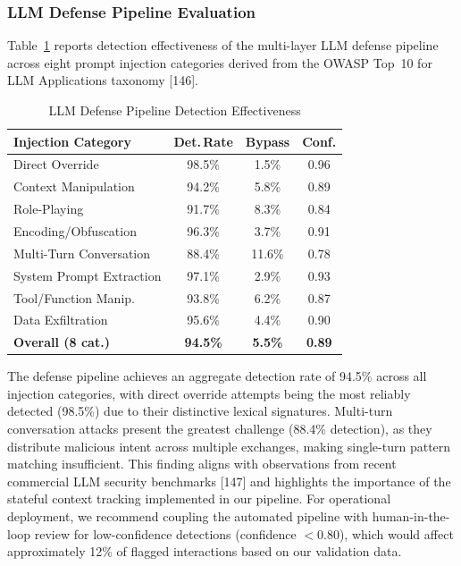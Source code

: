 \subsubsection{LLM Defense Pipeline Evaluation}

Table~\ref{tab:llm-defense} reports detection effectiveness of the
multi-layer LLM defense pipeline across eight prompt injection categories
derived from the OWASP Top~10 for LLM Applications taxonomy [146].

\begin{table}[!htbp]
\centering
\caption{LLM Defense Pipeline Detection Effectiveness}
\label{tab:llm-defense}
\renewcommand{\arraystretch}{1.15}
\begin{tabular}{@{}lccc@{}}
\toprule
\textbf{Injection Category} & \textbf{Det.\,Rate} & \textbf{Bypass} & \textbf{Conf.} \\
\midrule
Direct Override          & 98.5\% & 1.5\%  & 0.96 \\
Context Manipulation     & 94.2\% & 5.8\%  & 0.89 \\
Role-Playing             & 91.7\% & 8.3\%  & 0.84 \\
Encoding/Obfuscation     & 96.3\% & 3.7\%  & 0.91 \\
Multi-Turn Conversation  & 88.4\% & 11.6\% & 0.78 \\
System Prompt Extraction & 97.1\% & 2.9\%  & 0.93 \\
Tool/Function Manip.     & 93.8\% & 6.2\%  & 0.87 \\
Data Exfiltration        & 95.6\% & 4.4\%  & 0.90 \\
\midrule
\textbf{Overall (8 cat.)} & \textbf{94.5\%} & \textbf{5.5\%} & \textbf{0.89} \\
\bottomrule
\end{tabular}
\end{table}

The defense pipeline achieves an aggregate detection rate of 94.5\% across
all injection categories, with direct override attempts being the most
reliably detected (98.5\%) due to their distinctive lexical signatures.
Multi-turn conversation attacks present the greatest challenge (88.4\%
detection), as they distribute malicious intent across multiple exchanges,
making single-turn pattern matching insufficient. This finding aligns with
observations from recent commercial LLM security benchmarks [147] and
highlights the importance of the stateful context tracking implemented in
our pipeline. For operational deployment, we recommend coupling the
automated pipeline with human-in-the-loop review for low-confidence
detections (confidence $<0.80$), which would affect approximately 12\% of
flagged interactions based on our validation data.

